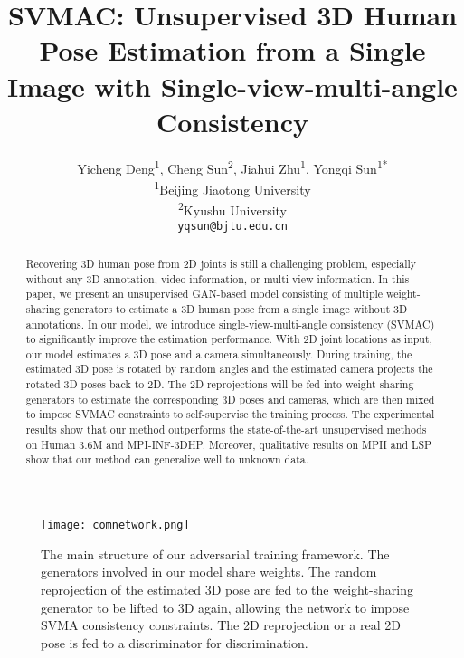 \documentclass[10pt,twocolumn,letterpaper]{article}
\begin{document}
\title{SVMAC: Unsupervised 3D Human Pose Estimation from a Single Image with Single-view-multi-angle Consistency}


\newcommand*{\affaddr}[1]{#1}
\newcommand*{\affmark}[1][*]{\textsuperscript{#1}}
\newcommand*{\email}[1]{\texttt{#1}}
\author{
Yicheng Deng\affmark[1], Cheng Sun\affmark[2], Jiahui Zhu\affmark[1], Yongqi Sun\affmark[1*]\\
\affaddr{\affmark[1]Beijing Jiaotong University}\\
\affaddr{\affmark[2]Kyushu University}\\
\email{\tt\small yqsun@bjtu.edu.cn}
}


\maketitle
\thispagestyle{empty}
\pagestyle{empty}

\begin{abstract}
Recovering 3D human pose from 2D joints is still a challenging problem, especially without any 3D annotation, video information, or multi-view information. In this paper, we present an unsupervised GAN-based model consisting of multiple weight-sharing generators to estimate a 3D human pose from a single image without 3D annotations. In our model, we introduce single-view-multi-angle consistency (SVMAC) to significantly improve the estimation performance. With 2D joint locations as input, our model estimates a 3D pose and a camera simultaneously. During training, the estimated 3D pose is rotated by random angles and the estimated camera projects the rotated 3D poses back to 2D. The 2D reprojections will be fed into weight-sharing generators to estimate the corresponding 3D poses and cameras, which are then mixed to impose SVMAC constraints to self-supervise the training process. The experimental results show that our method outperforms the state-of-the-art unsupervised methods on Human 3.6M and MPI-INF-3DHP.
Moreover, qualitative results on MPII and LSP show that our method can generalize well to unknown data.
\end{abstract}

\begin{figure*}[htbp]
\centering
\texttt{[image: comnetwork.png]}
\caption{The main structure of our adversarial training framework. The generators involved in our model share weights. 
The random reprojection of the estimated 3D pose are fed to the weight-sharing generator to be lifted to 3D again, allowing the network to impose SVMA consistency constraints. The 2D reprojection or a real 2D pose is fed to a discriminator for discrimination.} 
\label{netStruc}
\end{figure*}
\end{document}

